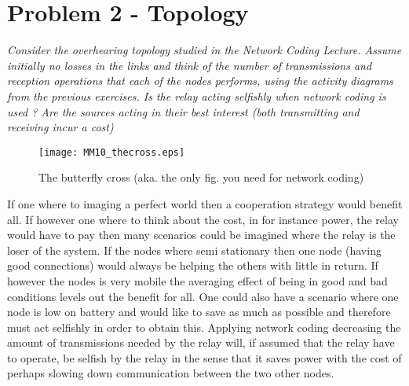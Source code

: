 \section{Problem 2 - Topology}
\textit{Consider the overhearing topology studied in the Network Coding Lecture. Assume initially no losses in the links and think of the number of transmissions and reception operations that each of the nodes performs, using the activity diagrams from the previous exercises. Is the relay acting selfishly when network coding is used ? Are the sources acting in their best interest (both transmitting and receiving incur a cost)}
\begin{figure}[!h]
  \centering
  \texttt{[image: MM10\_thecross.eps]}
  \caption{The butterfly cross (aka. the only fig. you need for network coding)}
  \label{fig:MM10_thecross}
\end{figure}

If one where to imaging a perfect world then a cooperation strategy would benefit all. If however one where to think about the cost, in for instance power, the relay would have to pay then many scenarios could be imagined where the relay is the loser of the system. If the nodes where semi stationary then one node (having good connections) would always be helping the others with little in return. If however the nodes is very mobile the averaging effect of being in good and bad conditions levels out the benefit for all. One could also have a scenario where one node is low on battery and would like to save as much as possible and therefore must act selfishly in order to obtain this. Applying network coding decreasing the amount of transmissions needed by the relay will, if assumed that the relay have to operate, be selfish by the relay in the sense that it saves power with the cost of perhaps slowing down communication between the two other nodes.